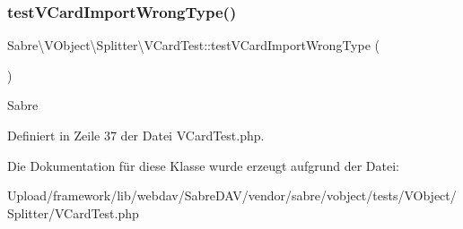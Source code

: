\subsubsection{\texorpdfstring{test\+V\+Card\+Import\+Wrong\+Type()}{testVCardImportWrongType()}}
{\footnotesize\ttfamily Sabre\textbackslash{}\+V\+Object\textbackslash{}\+Splitter\textbackslash{}\+V\+Card\+Test\+::test\+V\+Card\+Import\+Wrong\+Type (\begin{DoxyParamCaption}{ }\end{DoxyParamCaption})}

Sabre 

Definiert in Zeile 37 der Datei V\+Card\+Test.\+php.



Die Dokumentation für diese Klasse wurde erzeugt aufgrund der Datei\+:\begin{DoxyCompactItemize}
\item 
Upload/framework/lib/webdav/\+Sabre\+D\+A\+V/vendor/sabre/vobject/tests/\+V\+Object/\+Splitter/V\+Card\+Test.\+php\end{DoxyCompactItemize}
